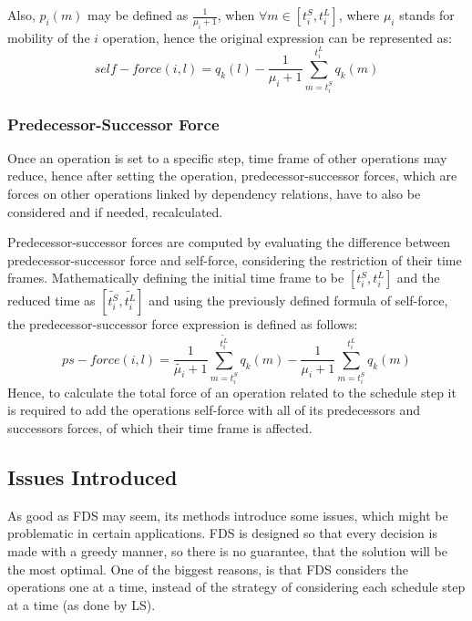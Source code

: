 \documentclass[conference]{IEEEtran}
\begin{document}
Also, $p_i(m)$ may be defined as $\frac{1}{\mu_i + 1}$, when  $\forall m \in [t_i^S, t_i^L]$, where $\mu_i$ stands for mobility of the $i$ operation, hence the original expression can be represented as:
\begin{equation*}
\displaystyle self-force(i, l) = q_k(l) - \frac{1}{\mu_i + 1}\sum_{m=t_i^S}^{t_i^L} q_k(m)
\end{equation*}
\subsubsection{Predecessor-Successor Force}

Once an operation is set to a specific step, time frame of other operations may reduce, hence after setting the operation, predecessor-successor forces, which are forces on other operations linked by dependency relations, have to also be considered and if needed, recalculated.

Predecessor-successor forces are computed by evaluating the difference between predecessor-successor force and self-force, considering the restriction of their time frames. Mathematically defining the initial time frame to be $[t_i^S, t_i^L]$ and the reduced time as $[\tilde{t_i^S}, \tilde{t_i^L}]$ and using the previously defined formula of self-force, the predecessor-successor force expression is defined as follows:
\begin{equation*}
\displaystyle ps-force(i, l) = \frac{1}{\tilde{\mu_i }+ 1}\sum_{m=t_i^S}^{\tilde{t_i^L}} q_k(m) - \frac{1}{\mu_i + 1}\sum_{m=t_i^S}^{t_i^L} q_k(m) 
\end{equation*}
Hence, to calculate the total force of an operation related to the schedule step it is required to add the operations self-force with all of its predecessors and successors forces, of which their time frame is affected.

\subsection{Issues Introduced}

As good as FDS may seem, its methods introduce some issues, which might be problematic in certain applications. FDS is designed so that every decision is made with a greedy manner, so there is no guarantee, that the solution will be the most optimal. One of the biggest reasons, is that FDS considers the operations one at a time, instead of the strategy of considering each schedule step at a time (as done by LS). 
\end{document}
